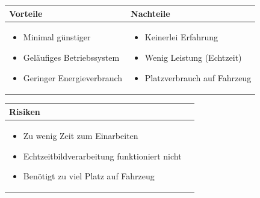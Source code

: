 \begin{table}[h]
\begin{tabular}{p{} | p{}}


 \textbf{Vorteile} & \textbf{Nachteile} \\ \hline
	 
\begin{itemize}
\item Minimal günstiger
\item Geläufiges Betriebssystem
\item Geringer Energieverbrauch
\end{itemize}

 
 &
 
\begin{itemize}
\item Keinerlei Erfahrung
\item Wenig Leistung (Echtzeit)
\item Platzverbrauch auf Fahrzeug
\end{itemize}

\end{tabular}
\end{table}

\begin{table}[h]
\begin{tabular}{p{}p{}}


 \textbf{Risiken} & \\ \hline
	 
\begin{itemize}
\item Zu wenig Zeit zum Einarbeiten
\item Echtzeitbildverarbeitung funktioniert nicht
\item Benötigt zu viel Platz auf Fahrzeug
\end{itemize}

 
\end{tabular}
\end{table}

\pagebreak